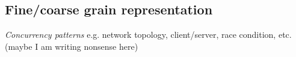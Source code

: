 %





%




\subsection{Fine/coarse grain representation}

{\em Concurrency patterns} e.g. network topology, client/server, race condition, etc. (maybe I am writing nonsense here)



